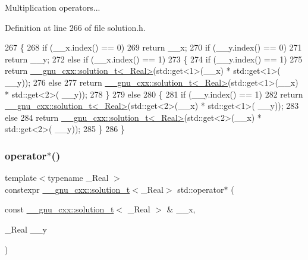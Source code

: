 Multiplication operators... 

Definition at line 266 of file solution.\+h.


\begin{DoxyCode}
267     \{
268       \textcolor{keywordflow}{if} (\_\_x.index() == 0)
269         \textcolor{keywordflow}{return} \_\_x;
270       \textcolor{keywordflow}{if} (\_\_y.index() == 0)
271         \textcolor{keywordflow}{return} \_\_y;
272       \textcolor{keywordflow}{else} \textcolor{keywordflow}{if} (\_\_x.index() == 1)
273         \{
274           \textcolor{keywordflow}{if} (\_\_y.index() == 1)
275             \textcolor{keywordflow}{return} \hyperlink{namespace____gnu__cxx_ae20ea642de50eb361074c62676b0159c}{\_\_gnu\_cxx::solution\_t<\_Real>}(std::get<1>(\_\_x) * std::get<1>(
      \_\_y));
276           \textcolor{keywordflow}{else}
277             \textcolor{keywordflow}{return} \hyperlink{namespace____gnu__cxx_ae20ea642de50eb361074c62676b0159c}{\_\_gnu\_cxx::solution\_t<\_Real>}(std::get<1>(\_\_x) * std::get<2>(
      \_\_y));
278         \}
279       \textcolor{keywordflow}{else}
280         \{
281           \textcolor{keywordflow}{if} (\_\_y.index() == 1)
282             \textcolor{keywordflow}{return} \hyperlink{namespace____gnu__cxx_ae20ea642de50eb361074c62676b0159c}{\_\_gnu\_cxx::solution\_t<\_Real>}(std::get<2>(\_\_x) * std::get<1>(
      \_\_y));
283           \textcolor{keywordflow}{else}
284             \textcolor{keywordflow}{return} \hyperlink{namespace____gnu__cxx_ae20ea642de50eb361074c62676b0159c}{\_\_gnu\_cxx::solution\_t<\_Real>}(std::get<2>(\_\_x) * std::get<2>(
      \_\_y));
285         \}
286     \}
\end{DoxyCode}
\mbox{\label{namespacestd_a13970e4b2bf6680ae3284c0f1117ea4d}} 
\subsubsection{\texorpdfstring{operator$\ast$()}{operator*()}\hspace{0.1cm}{\footnotesize\ttfamily [2/5]}}
{\footnotesize\ttfamily template$<$typename \+\_\+\+Real $>$ \\
constexpr \hyperlink{namespace____gnu__cxx_ae20ea642de50eb361074c62676b0159c}{\+\_\+\+\_\+gnu\+\_\+cxx\+::solution\+\_\+t}$<$\+\_\+\+Real$>$ std\+::operator$\ast$ (\begin{DoxyParamCaption}\item[{const \hyperlink{namespace____gnu__cxx_ae20ea642de50eb361074c62676b0159c}{\+\_\+\+\_\+gnu\+\_\+cxx\+::solution\+\_\+t}$<$ \+\_\+\+Real $>$ \&}]{\+\_\+\+\_\+x,  }\item[{\+\_\+\+Real}]{\+\_\+\+\_\+y }\end{DoxyParamCaption})}



